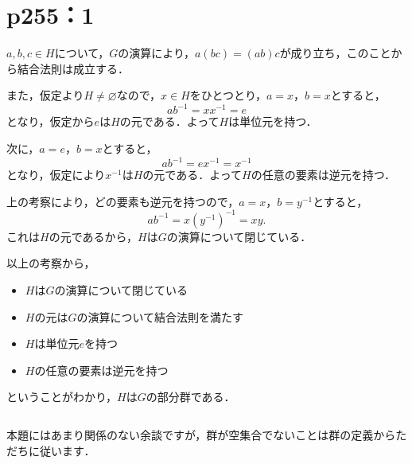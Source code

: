 \section*{p255：1}
\begin{tproof}
  $a,b,c \in H$について，$G$の演算により，$a(bc)=(ab)c$が成り立ち，このことから結合法則は成立する．

  また，仮定より$H \ne \varnothing $なので，$x \in H$をひとつとり，$a=x$，$b=x$とすると，
  \[
    ab^{-1} = x x^{-1}=e
  \]
  となり，仮定から$e$は$H$の元である．よって$H$は単位元を持つ．

  次に，$ a=e$，$b=x$とすると，
  \[
    ab^{-1}=ex^{-1}=x^{-1}
  \]
  となり，仮定により$x^{-1}$は$H$の元である．よって$H$の任意の要素は逆元を持つ．

  上の考察により，どの要素も逆元を持つので，$a=x$，$b=y^{-1}$とすると，
  \[
    ab^{-1}=x(y^{-1})^{-1} = xy.
  \]
  これは$H$の元であるから，$H$は$G$の演算について閉じている．

  以上の考察から，
  \begin{itemize}
    \item $H$は$G$の演算について閉じている
    \item $H$の元は$G$の演算について結合法則を満たす
    \item $H$は単位元$e$を持つ
    \item $H$の任意の要素は逆元を持つ
  \end{itemize}
  ということがわかり，$H$は$G$の部分群である．
\end{tproof}

\begin{column}
  本題にはあまり関係のない余談ですが，群が空集合でないことは群の定義からただちに従います．
\end{column}